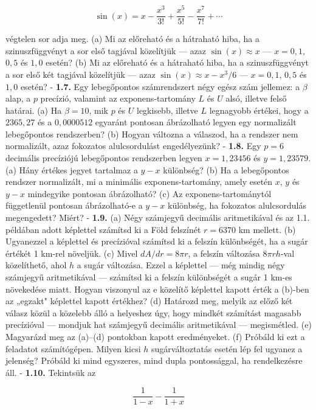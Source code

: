 \documentclass[
  magyar,
  11pt]{article}
\begin{document}
\[\sin(x) = x - \frac{x^3}{3!} + \frac{x^5}{5!} - \frac{x^7}{7!} + \cdots\]

végtelen sor adja meg. (a) Mi az előreható és a hátraható hiba, ha a
szinuszfüggvényt a sor első tagjával közelítjük --- azaz
\(\sin(x) \approx x\) --- \(x = 0{,}1\), \(0{,}5\) és \(1{,}0\) esetén?
(b) Mi az előreható és a hátraható hiba, ha a szinuszfüggvényt a sor
első két tagjával közelítjük --- azaz \(\sin(x) \approx x - x^3/6\) ---
\(x = 0{,}1\), \(0{,}5\) és \(1{,}0\) esetén? - \textbf{1.7.} Egy
lebegőpontos számrendszert négy egész szám jellemez: a \(\beta\) alap, a
\(p\) precízió, valamint az exponens-tartomány \(L\) és \(U\) alsó,
illetve felső határai. (a) Ha \(\beta = 10\), mik \(p\) és \(U\)
legkisebb, illetve \(L\) legnagyobb értékei, hogy a \(2365{,}27\) és a
\(0{,}0000512\) egyaránt pontosan ábrázolható legyen egy normalizált
lebegőpontos rendszerben? (b) Hogyan változna a válaszod, ha a rendszer
nem normalizált, azaz fokozatos alulcsordulást engedélyezünk? -
\textbf{1.8.} Egy \(p = 6\) decimális precíziójú lebegőpontos
rendszerben legyen \(x = 1{,}23456\) és \(y = 1{,}23579\). (a) Hány
értékes jegyet tartalmaz a \(y - x\) különbség? (b) Ha a lebegőpontos
rendszer normalizált, mi a minimális exponens-tartomány, amely esetén
\(x\), \(y\) és \(y - x\) mindegyike pontosan ábrázolható? (c) Az
exponens-tartománytól függetlenül pontosan ábrázolható-e a \(y - x\)
különbség, ha fokozatos alulcsordulás megengedett? Miért? -
\textbf{1.9.} (a) Négy számjegyű decimális aritmetikával és az 1.1.
példában adott képlettel számítsd ki a Föld felszínét \(r = 6370\) km
mellett. (b) Ugyanezzel a képlettel és precízióval számítsd ki a felszín
különbségét, ha a sugár értékét 1 km-rel növeljük. (c) Mivel
\(dA/dr = 8\pi r\), a felszín változása \(8\pi r h\)-val közelíthető,
ahol \(h\) a sugár változása. Ezzel a képlettel --- még mindig négy
számjegyű aritmetikával --- számítsd ki a felszín különbségét a sugár 1
km-es növekedése miatt. Hogyan viszonyul az e közelítő képlettel kapott
érték a (b)-ben az „egzakt" képlettel kapott értékhez? (d) Határozd meg,
melyik az előző két válasz közül a közelebb álló a helyeshez úgy, hogy
mindkét számítást magasabb precízióval --- mondjuk hat számjegyű
decimális aritmetikával --- megismétled. (e) Magyarázd meg az (a)--(d)
pontokban kapott eredményeket. (f) Próbáld ki ezt a feladatot
számítógépen. Milyen kicsi \(h\) sugárváltoztatás esetén lép fel ugyanez
a jelenség? Próbáld ki mind egyszeres, mind dupla pontossággal, ha
rendelkezésre áll. - \textbf{1.10.} Tekintsük az

\[\frac{1}{1-x} - \frac{1}{1+x}\]
\end{document}
